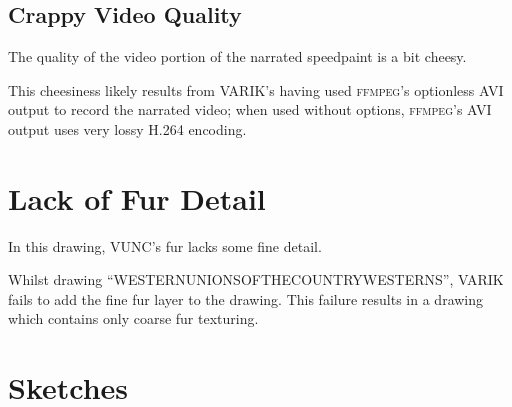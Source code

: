 \documentclass{report}
\begin{document}
\subsection{Crappy Video Quality}
The quality of the video portion of the narrated speedpaint is a bit cheesy.

This cheesiness likely results from VARIK's having used \textsc{ffmpeg}'s optionless AVI output to record the narrated video; when used without options, \textsc{ffmpeg}'s AVI output uses very lossy H.264 encoding.
\section{Lack of Fur Detail}
In this drawing, VUNC's fur lacks some fine detail.

Whilst drawing ``WESTERNUNIONSOFTHECOUNTRYWESTERNS'', VARIK fails to add the fine fur layer to the drawing.  This failure results in a drawing which contains only coarse fur texturing.
\section{Sketches}
\end{document}
